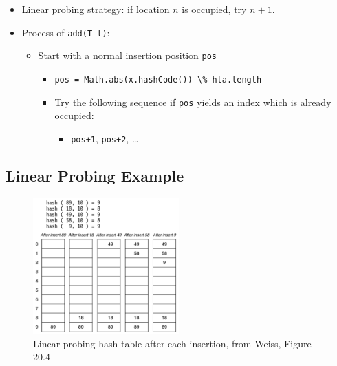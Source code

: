 \documentclass[
  10pt,
  english,
  letterpaper,
,tablecaptionabove
]{scrartcl}
\newcommand{\passthrough}[1]{#1}
\providecommand{\tightlist}{%
  \setlength{\itemsep}{0pt}\setlength{\parskip}{0pt}}
\begin{document}
\begin{itemize}
\tightlist
\item
  Linear probing strategy: if location \(n\) is occupied, try \(n+1\).
\item
  Process of \passthrough{\lstinline!add(T t)!}:

  \begin{itemize}
  \tightlist
  \item
    Start with a normal insertion position \passthrough{\lstinline!pos!}

    \begin{itemize}
    \tightlist
    \item
      \passthrough{\lstinline!pos = Math.abs(x.hashCode()) \% hta.length!}
    \item
      Try the following sequence if \passthrough{\lstinline!pos!} yields
      an index which is already occupied:

      \begin{itemize}
      \tightlist
      \item
        \passthrough{\lstinline!pos+1!},
        \passthrough{\lstinline!pos+2!}, \ldots{}
      \end{itemize}
    \end{itemize}
  \end{itemize}
\end{itemize}

\hypertarget{linear-probing-example}{%
\subsection{Linear Probing Example}\label{linear-probing-example}}

\begin{figure}
\centering
\includegraphics[width=0.5\textwidth,height=\textheight]{images/1.png}
\caption{Linear probing hash table after each insertion, from Weiss,
Figure 20.4}
\end{figure}
\end{document}
